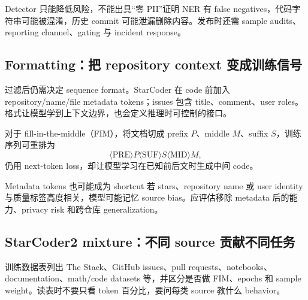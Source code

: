 \begin{warningbox}{Detector 只能降低风险，不能出具“零 PII”证明}
NER 有 false negatives，代码字符串可能被混淆，历史 commit 可能泄漏删除内容。发布时还需 sample audits、reporting channel、gating 与 incident response。
\end{warningbox}


\subsection{Formatting：把 repository context 变成训练信号}

过滤后仍需决定 sequence format。StarCoder 在 code 前加入 repository/name/file metadata tokens；issues 包含 title、comment、user roles。格式让模型学到上下文边界，也会定义推理时可控制的接口。



对于 fill-in-the-middle（FIM），将文档切成 prefix $P$、middle $M$、suffix $S$，训练序列可重排为
\[
\langle\text{PRE}\rangle P\langle\text{SUF}\rangle S
\langle\text{MID}\rangle M,
\]
仍用 next-token loss，却让模型学习在已知前后文时生成中间 code。

\begin{warningbox}{Metadata tokens 也可能成为 shortcut}
若 stars、repository name 或 user identity 与质量标签高度相关，模型可能记忆 source bias。应评估移除 metadata 后的能力、privacy risk 和跨仓库 generalization。
\end{warningbox}

\subsection{StarCoder2 mixture：不同 source 贡献不同任务}

训练数据表列出 The Stack、GitHub issues、pull requests、notebooks、documentation、math/code datasets 等，并区分是否做 FIM、epochs 和 sample weight。读表时不要只看 token 百分比，要问每类 source 教什么 behavior。


